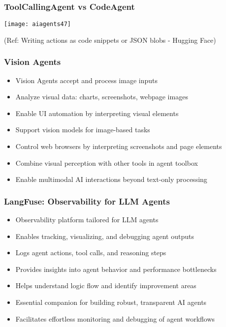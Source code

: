 \begin{frame}[fragile]\frametitle{ToolCallingAgent vs CodeAgent}
	
	\begin{center}
	\texttt{[image: aiagents47]}
	
	{\tiny (Ref: Writing actions as code snippets or JSON blobs - Hugging Face)}
	\end{center}
	
\end{frame}

\begin{frame}[fragile]\frametitle{Vision Agents}
      \begin{itemize}
	\item Vision Agents accept and process image inputs
	\item Analyze visual data: charts, screenshots, webpage images
	\item Enable UI automation by interpreting visual elements
	\item Support vision models for image-based tasks
	\item Control web browsers by interpreting screenshots and page elements
	\item Combine visual perception with other tools in agent toolbox
	\item Enable multimodal AI interactions beyond text-only processing
	  \end{itemize}
\end{frame}

\begin{frame}[fragile]\frametitle{LangFuse: Observability for LLM Agents}
      \begin{itemize}
	\item Observability platform tailored for LLM agents
	\item Enables tracking, visualizing, and debugging agent outputs
	\item Logs agent actions, tool calls, and reasoning steps
	\item Provides insights into agent behavior and performance bottlenecks
	\item Helps understand logic flow and identify improvement areas
	\item Essential companion for building robust, transparent AI agents
	\item Facilitates effortless monitoring and debugging of agent workflows
	  \end{itemize}
\end{frame}

